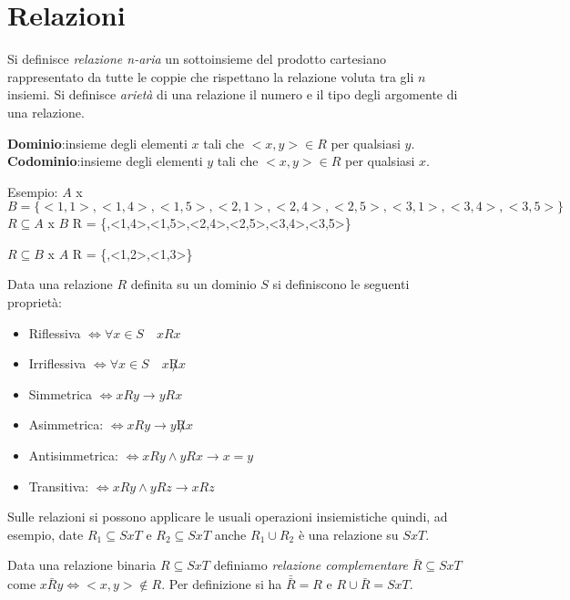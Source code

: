 \chapter{Relazioni}
Si definisce \textit{relazione n-aria} un sottoinsieme del prodotto cartesiano
rappresentato da tutte le coppie che rispettano la relazione voluta tra gli $n$ insiemi.
Si definisce \textit{arietà} di una relazione il numero e il tipo degli argomente
di una relazione.

\textbf{Dominio}:insieme degli elementi $x$ tali che $<x,y> \in R$ per qualsiasi $y$.
\textbf{Codominio}:insieme degli elementi $y$ tali che $<x,y> \in R$ per qualsiasi $x$.

Esempio:\newline
$A$ x $B = \{<1,1>,<1,4>,<1,5>,<2,1>,<2,4>,<2,5>,<3,1>,<3,4>,<3,5>\} $ \newline
$R \subseteq A$ x $B$\newline
R = \{<1,1>,<1,4>,<1,5>,<2,4>,<2,5>,<3,4>,<3,5>\}

$R \subseteq B$ x $A$ \newline
R = \{<1,1>,<1,2>,<1,3>\}

Data una relazione $R$ definita su un dominio $S$ si definiscono le seguenti proprietà:

\begin{itemize}
  \item Riflessiva $\iff \forall x \in S \quad xRx$
  \item Irriflessiva $\iff \forall x \in S \quad x \not R x$
  \item Simmetrica $\iff  xRy \rightarrow yRx$
  \item Asimmetrica: $\iff xRy \rightarrow y \not R x$
  \item Antisimmetrica: $\iff xRy \land yRx \rightarrow x = y$
  \item Transitiva: $\iff xRy \land yRz \rightarrow xRz$
\end{itemize}

Sulle relazioni si possono applicare le usuali operazioni insiemistiche quindi, ad esempio,
date $R_1 \subseteq S x T$ e $R_2 \subseteq S x T$ anche $R_1 \cup R_2$ è una relazione su $S x T$.

Data una relazione binaria $R \subseteq S x T$ definiamo \emph{relazione complementare}
$\bar{R} \subseteq S x T$ come $x \bar{R}y \iff <x,y> \not \in R$.
Per definizione si ha $\bar{\bar{R}} = R$ e $R \cup \bar{R} = S x T$.

